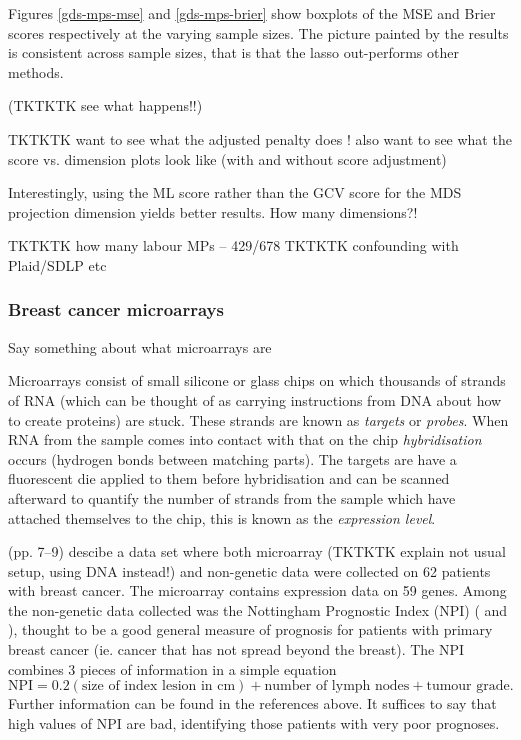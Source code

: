 Figures \ref{gds-mps-mse} and \ref{gds-mps-brier} show boxplots of the MSE and Brier scores respectively at the varying sample sizes. The picture painted by the results is consistent across sample sizes, that is that the lasso out-performs other methods.

(TKTKTK see what happens!!)

TKTKTK want to see what the adjusted penalty does !
      also want to see what the score vs. dimension plots look like (with and without score adjustment)


Interestingly, using the ML score rather than the GCV score for the MDS projection dimension yields better results.
How many dimensions?!



TKTKTK  how many labour MPs   -- 429/678
TKTKTK confounding with Plaid/SDLP etc






\subsubsection{Breast cancer microarrays}

Say something about what microarrays are

Microarrays consist of small silicone or glass chips on which thousands of strands of RNA (which can be thought of as carrying instructions from DNA about how to create proteins) are stuck. These strands are known as \textit{targets} or \textit{probes}. When RNA from the sample comes into contact with that on the chip \textit{hybridisation} occurs (hydrogen bonds between matching parts). The targets are have a fluorescent die applied to them before hybridisation and can be scanned afterward to quantify the number of strands from the sample which have attached themselves to the chip, this is known as the \textit{expression level}.

\cite{ernstbook} (pp. 7--9) descibe a data set where both microarray (TKTKTK explain not usual setup, using DNA instead!) and non-genetic data were collected on 62 patients with breast cancer. The microarray contains expression data on 59 genes. Among the non-genetic data collected was the Nottingham Prognostic Index (NPI) (\cite{Haybittle1982} and \cite{Todd1987}), thought to be a good general measure of prognosis for patients with primary breast cancer (ie. cancer that has not spread beyond the breast). The NPI combines 3 pieces of information in a simple equation
\begin{equation}
\text{NPI} = 0.2(\text{size of index lesion in cm}) + \text{number of lymph nodes} + \text{tumour grade}.
\end{equation}
Further information can be found in the references above. It suffices to say that high values of NPI are bad, identifying those patients with very poor prognoses.

